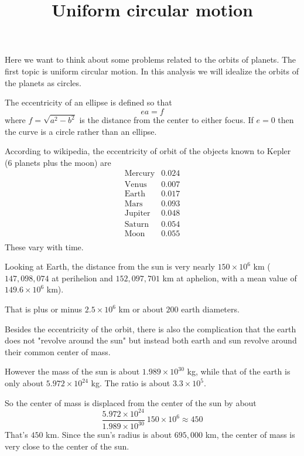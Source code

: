 \documentclass[11pt, oneside]{article}
\title{Uniform circular motion}
\date{}
\begin{document}
\maketitle
\Large


\label{sec:Uniform_circular_motion}

Here we want to think about some problems related to the orbits of planets.  The first topic is uniform circular motion.  In this analysis we will idealize the orbits of the planets as circles.

The eccentricity of an ellipse is defined so that
\[ ea = f  \] 
where $f = \sqrt{a^2 - b^2}$ is the distance from the center to either focus.  If $e = 0$ then the curve is a circle rather than an ellipse.

According to wikipedia, the eccentricity of orbit of the objects known to Kepler (6 planets plus the moon) are
\[ 
\begin{array}{lcr}
\mbox{Mercury} & 0.024  \\
\mbox{Venus} & 0.007  \\
\mbox{Earth} & 0.017  \\
\mbox{Mars} & 0.093  \\
\mbox{Jupiter} & 0.048  \\
\mbox{Saturn} & 0.054  \\
\mbox{Moon} & 0.055  \\
\end{array}
\] 
These vary with time.

Looking at Earth, the distance from the sun is very nearly $150 \times 10^6$ km ($147,098,074$ at perihelion and $152,097,701$ km at aphelion, with a mean value of $149.6 \times 10^6$ km).

That is plus or minus $2.5 \times 10^6$ km or about $200$ earth diameters.

Besides the eccentricity of the orbit, there is also the complication that the earth does not "revolve around the sun" but instead both earth and sun revolve around their common center of mass. 

However the mass of the sun is about  $1.989 \times 10^{30}$ kg, while that of the earth is only about $5.972 \times 10^{24}$ kg.  The ratio is about $3.3 \times 10^5$.

So the center of mass is displaced from the center of the sun by about 
\[ \frac{5.972 \times 10^{24}}{1.989 \times 10^{30}} \ 150 \times 10^6 \approx 450 \]
That's $450$ km.  Since the sun's radius is about $695,000$ km, the center of mass is very close to the center of the sun.
\end{document}
